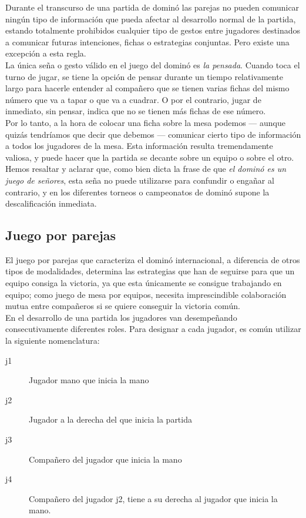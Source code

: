 Durante el transcurso de una partida de dominó las parejas no pueden comunicar ningún tipo de información
que pueda afectar al desarrollo normal de la partida, estando totalmente prohibidos cualquier tipo de gestos
entre jugadores destinados a comunicar futuras intenciones, fichas o estrategias conjuntas. Pero existe
una excepción a esta regla. \\

La única seña o gesto válido en el juego del dominó es \emph{la pensada}. Cuando toca el turno de jugar, se tiene la
opción de pensar durante un tiempo relativamente largo para hacerle entender al compañero que se tienen
varias fichas del mismo número que va a tapar o que va a cuadrar. O por el contrario, jugar de inmediato,
sin pensar, indica que no se tienen más fichas de ese número. \\

Por lo tanto, a la hora de colocar una ficha sobre la mesa podemos --- aunque quizás tendríamos que decir que 
debemos --- comunicar cierto tipo de información a todos los jugadores de la mesa. Esta información resulta
tremendamente valiosa, y puede hacer que la partida se decante sobre un equipo o sobre el otro. \\

Hemos resaltar y aclarar que, como bien dicta la frase de que \emph{el dominó es un juego de señores},
esta seña no puede utilizarse para confundir o engañar al contrario, y en los diferentes torneos o campeonatos
de dominó supone la descalificación inmediata.


\subsection{Juego por parejas}
\label{juegoporparejas}

El juego por parejas que caracteriza el dominó internacional, a diferencia de otros tipos de modalidades,
determina las estrategias que han de seguirse para que un equipo consiga la victoria, ya que esta únicamente
se consigue trabajando en equipo; como juego de mesa por equipos, necesita imprescindible colaboración
mutua entre compañeros si se quiere conseguir la victoria común. \\

En el desarrollo de una partida los jugadores van desempeñando consecutivamente diferentes roles. Para designar
a cada jugador, es común utilizar la siguiente nomenclatura: 

\begin{description}
    \item[j1] Jugador mano que inicia la mano
    \item[j2] Jugador a la derecha del que inicia la partida
    \item[j3] Compañero del jugador que inicia la mano
    \item[j4] Compañero del jugador j2, tiene a su derecha al jugador que inicia la mano.
\end{description}

